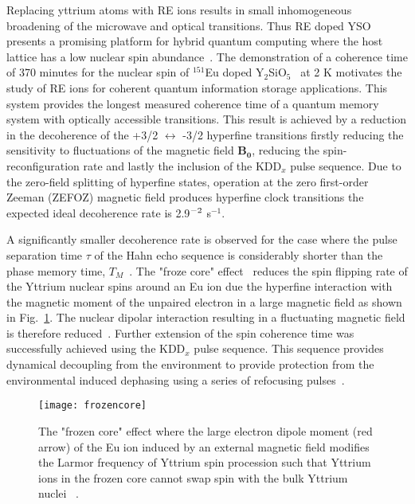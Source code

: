 Replacing yttrium atoms with RE ions results in small inhomogeneous broadening of the microwave and optical transitions. Thus RE doped YSO presents a promising platform for hybrid quantum computing where the host lattice has a low nuclear spin abundance~\citep{PhysRevB.97.064409}. The demonstration of a coherence time of 370 minutes for the nuclear spin of $^{151}$Eu doped Y$_{2}$SiO$_{5}$~\citep{nature14025} at 2 K motivates the study of RE ions for coherent quantum information storage applications. This system provides the longest measured coherence time of a quantum memory system with optically accessible transitions. This result is achieved by a reduction in the decoherence of the +3/2 $\leftrightarrow$ -3/2 hyperfine transitions firstly reducing the sensitivity to fluctuations of the magnetic field $\bm{B_{0}}$, reducing the spin-reconfiguration rate and lastly the inclusion of the KDD$_{x}$ pulse sequence. Due to the zero-field splitting of hyperfine states, operation at the zero first-order Zeeman (ZEFOZ) magnetic field produces hyperfine clock transitions the expected ideal decoherence rate is 2.9$\time 10^{-2}$ s$^{-1}$. 

A significantly smaller decoherence rate is observed for the case where the pulse separation time  $\tau$ of the Hahn echo sequence is considerably shorter than the phase memory time, $T_{M}$~\citep{PhysRev.168.370}. The "froze core" effect~\citep{PhysRevB.91.214303} reduces the spin flipping rate of the Yttrium nuclear spins around an Eu ion due the hyperfine interaction with the magnetic moment of the unpaired electron in a large magnetic field as shown in Fig.~\ref{fig:frozencore}. The nuclear dipolar interaction resulting in a fluctuating magnetic field is therefore reduced~\citep{RevModPhys.79.1217}. Further extension of the spin coherence time was successfully achieved using the KDD$_{x}$ pulse sequence. This sequence provides dynamical decoupling from the environment to provide protection from the environmental induced dephasing using a series of refocusing pulses~\citep{PhysRevLett.106.240501}. 

\begin{figure}[h]
\centering
\texttt{[image: frozencore]}
\caption{\label{fig:frozencore} The "frozen core" effect where the large electron dipole moment (red arrow) of the Eu ion induced by an external magnetic field modifies the Larmor frequency of Yttrium spin procession such that Yttrium ions in the frozen core cannot swap spin with the bulk Yttrium nuclei ~\citep{nature14025}.}
\end{figure}



